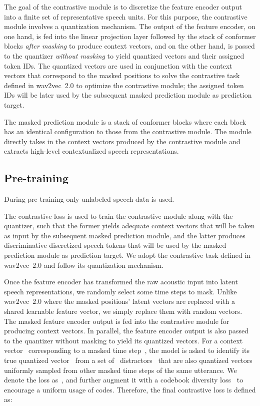 \documentclass{article}
\begin{document}
The goal of the contrastive module is to discretize the feature encoder output into a finite set of representative speech units.
For this purpose, the contrastive module involves a quantization mechanism.
The output of the feature encoder, on one hand, is fed into the linear projection layer followed by the stack of conformer blocks {\it after masking} to produce context vectors, and on the other hand, is passed to the quantizer {\it without masking} to yield quantized vectors and their assigned token IDs.
The quantized vectors are used in conjunction with the context vectors that correspond to the masked positions to solve the contrastive task defined in wav2vec~2.0 to optimize the contrastive module; the assigned token IDs will be later used by the subsequent masked prediction module as prediction target.

The masked prediction module is a stack of conformer blocks where each block has an identical configuration to those from the contrastive module.
The module directly takes in the context vectors produced by the contrastive module and extracts high-level contextualized speech representations.

\subsection{Pre-training}
During pre-training only unlabeled speech data is used.

The contrastive loss is used to train the contrastive module along with the quantizer, such that the former yields adequate context vectors that will be taken as input by the subsequent masked prediction module, and the latter produces discriminative discretized speech tokens that will be used by the masked prediction module as prediction target.
We adopt the contrastive task defined in wav2vec~2.0 and follow its quantization mechanism.

Once the feature encoder has transformed the raw acoustic input into latent speech representations, we randomly select some time steps to mask.
Unlike wav2vec~2.0 where the masked positions' latent vectors are replaced with a shared learnable feature vector, we simply replace them with random vectors.
The masked feature encoder output is fed into the contrastive module for producing context vectors.
In parallel, the feature encoder output is also passed to the quantizer without masking to yield its quantized vectors.
For a context vector~ corresponding to a masked time step~, the model is asked to identify its true quantized vector~ from a set of~ distractors~ that are also quantized vectors uniformly sampled from other masked time steps of the same utterance.
We denote the loss as~, and further augment it with a codebook diversity loss~ to encourage a uniform usage of codes.
Therefore, the final contrastive loss is defined as:
\end{document}
